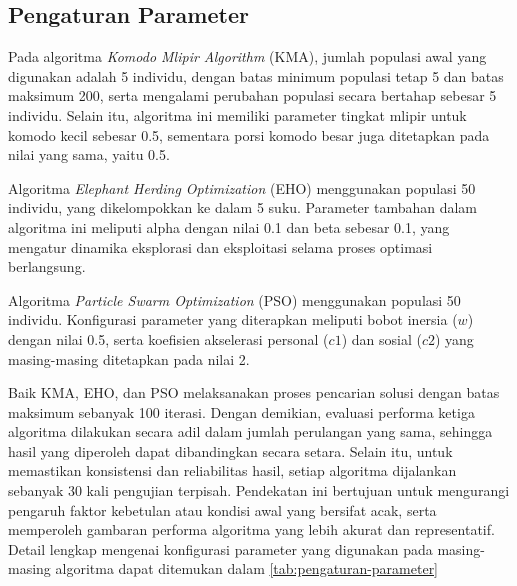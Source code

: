 \subsection{Pengaturan Parameter}
Pada algoritma \textit{Komodo Mlipir Algorithm} (KMA), jumlah populasi awal yang digunakan adalah 5 individu, dengan batas minimum populasi tetap 5 dan batas maksimum 200, serta mengalami perubahan populasi secara bertahap sebesar 5 individu. Selain itu, algoritma ini memiliki parameter tingkat mlipir untuk komodo kecil sebesar 0.5, sementara porsi komodo besar juga ditetapkan pada nilai yang sama, yaitu 0.5.

Algoritma \textit{Elephant Herding Optimization} (EHO) menggunakan populasi 50 individu, yang dikelompokkan ke dalam 5 suku. Parameter tambahan dalam algoritma ini meliputi alpha dengan nilai 0.1 dan beta sebesar 0.1, yang mengatur dinamika eksplorasi dan eksploitasi selama proses optimasi berlangsung.

Algoritma \textit{Particle Swarm Optimization} (PSO) menggunakan populasi 50 individu. Konfigurasi parameter yang diterapkan meliputi bobot inersia ($w$) dengan nilai 0.5, serta koefisien akselerasi personal ($c1$) dan sosial ($c2$) yang masing-masing ditetapkan pada nilai 2.

Baik KMA, EHO, dan PSO melaksanakan proses pencarian solusi dengan batas maksimum sebanyak 100 iterasi. Dengan demikian, evaluasi performa ketiga algoritma dilakukan secara adil dalam jumlah perulangan yang sama, sehingga hasil yang diperoleh dapat dibandingkan secara setara. Selain itu, untuk memastikan konsistensi dan reliabilitas hasil, setiap algoritma dijalankan sebanyak 30 kali pengujian terpisah. Pendekatan ini bertujuan untuk mengurangi pengaruh faktor kebetulan atau kondisi awal yang bersifat acak, serta memperoleh gambaran performa algoritma yang lebih akurat dan representatif. Detail lengkap mengenai konfigurasi parameter yang digunakan pada masing-masing algoritma dapat ditemukan dalam \cref{tab:pengaturan-parameter}

